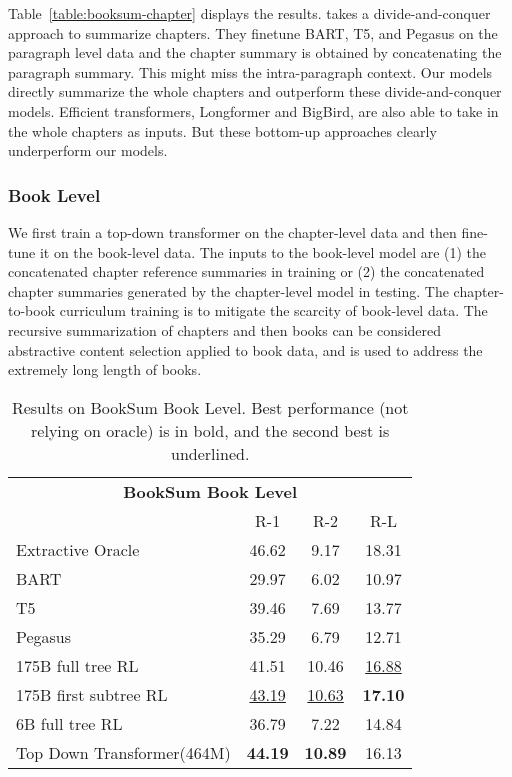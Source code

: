 \documentclass{article} \usepackage{iclr2022_conference,times}
\newcommand{\todof}{{Top Down Transformer}\xspace} \newcommand{\todofull}{{Top Down Transformer}\xspace} \newcommand\todo[1]{\textcolor{red}{(#1)}}
\begin{document}
Table~\ref{table:booksum-chapter} displays the results. \cite{kryscinski2021booksum} takes a divide-and-conquer approach to summarize chapters. They finetune BART, T5, and Pegasus on the paragraph level data and the chapter summary is obtained by concatenating the paragraph summary. This might miss the intra-paragraph context. Our models directly summarize the whole chapters and outperform these divide-and-conquer models. Efficient transformers, Longformer and BigBird, are also able to take in the whole chapters as inputs. But these bottom-up approaches clearly underperform our models.  



\subsubsection{Book Level}
We first train a top-down transformer on the chapter-level data and then fine-tune it on the book-level data. The inputs to the book-level model are (1) the concatenated chapter reference summaries in training or (2) the concatenated chapter summaries generated by the chapter-level model in testing. The chapter-to-book curriculum training is to mitigate the scarcity of book-level data. The recursive summarization of chapters and then books can be considered abstractive content selection applied to book data, and is used to address the extremely long length of books.


\begin{table}[h!]
\small
\centering
\begin{tabular}{l c c c} 
\toprule
\multicolumn{4}{c}{\textbf{BookSum Book Level}}\\
& R-1 & R-2 & R-L \\
\hline
Extractive Oracle  & 46.62 & 9.17 & 18.31 \\ 
\hline
BART  & 29.97 & 6.02 & 10.97 \\ 
T5  &  39.46 & 7.69 & 13.77 \\ 
Pegasus  & 35.29 & 6.79 & 12.71 \\  
\hline
175B full tree RL  & 41.51 & 10.46 & \underline{16.88} \\ 
175B first subtree RL  & \underline{43.19} & \underline{10.63} & \textbf{17.10} \\ 
6B full tree RL  & 36.79 & 7.22 & 14.84 \\ 
\hline
\todof(464M)  & \textbf{44.19} & \textbf{10.89} & 16.13 \\ 
\hline
\end{tabular}
\caption{\scriptsize Results on BookSum Book Level. Best performance (not relying on oracle) is in bold, and the second best is underlined.}
\label{table:booksum-book}
\end{table}
\end{document}
